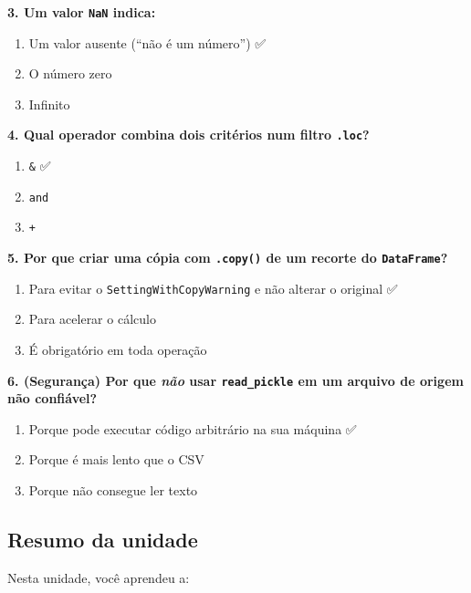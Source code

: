 \documentclass[
  brazilian,
  11pt,
]{article}
\providecommand{\tightlist}{%
  \setlength{\itemsep}{0pt}\setlength{\parskip}{0pt}}
\let\oldtexttt\texttt
\renewcommand{\texttt}[1]{{\color{inlink}\oldtexttt{#1}}}
\begin{document}
\textbf{3. Um valor \texttt{NaN} indica:}

\begin{enumerate}
\def\labelenumi{\arabic{enumi}.}
\tightlist
\item
  Um valor ausente (``não é um número'') ✅
\item
  O número zero
\item
  Infinito
\end{enumerate}

\textbf{4. Qual operador combina dois critérios num filtro
\texttt{.loc}?}

\begin{enumerate}
\def\labelenumi{\arabic{enumi}.}
\tightlist
\item
  \texttt{\&} ✅
\item
  \texttt{and}
\item
  \texttt{+}
\end{enumerate}

\textbf{5. Por que criar uma cópia com \texttt{.copy()} de um recorte do
\texttt{DataFrame}?}

\begin{enumerate}
\def\labelenumi{\arabic{enumi}.}
\tightlist
\item
  Para evitar o \texttt{SettingWithCopyWarning} e não alterar o original
  ✅
\item
  Para acelerar o cálculo
\item
  É obrigatório em toda operação
\end{enumerate}

\textbf{6. (Segurança) Por que \emph{não} usar \texttt{read\_pickle} em
um arquivo de origem não confiável?}

\begin{enumerate}
\def\labelenumi{\arabic{enumi}.}
\tightlist
\item
  Porque pode executar código arbitrário na sua máquina ✅
\item
  Porque é mais lento que o CSV
\item
  Porque não consegue ler texto
\end{enumerate}

\subsection{Resumo da unidade}\label{resumo-da-unidade}

Nesta unidade, você aprendeu a:
\end{document}
